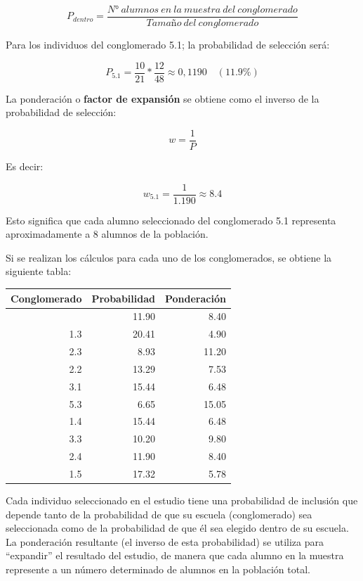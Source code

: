\documentclass[
  spanish,
  a4paper,
]{scrbook}
\begin{document}
\[
P_{dentro} = \frac{N°~alumnos~en~la~muestra~del~conglomerado}{Tamaño~del~conglomerado}
\]

Para los individuos del conglomerado 5.1; la probabilidad de selección
será:

\[
P_{5.1} = \frac{10}{21}*\frac{12}{48} \approx 0,1190 \quad (11.9\%)
\]

La ponderación o \textbf{factor de expansión} se obtiene como el inverso
de la probabilidad de selección:

\[
w = \frac{1}{P}
\]

Es decir:

\[
w_{5.1} = \frac{1}{1.190} \approx 8.4
\]

Esto significa que cada alumno seleccionado del conglomerado 5.1
representa aproximadamente a 8 alumnos de la población.

Si se realizan los cálculos para cada uno de los conglomerados, se
obtiene la siguiente tabla:

\begin{table}
\fontsize{12.0pt}{14.0pt}\selectfont
\begin{tabular*}{\linewidth}{@{\extracolsep{\fill}}rrr}
\toprule
Conglomerado & Probabilidad & Ponderación \\ 
\midrule\addlinespace[2.5pt]
5.1 & 11.90 & 8.40 \\ 
1.3 & 20.41 & 4.90 \\ 
2.3 & 8.93 & 11.20 \\ 
2.2 & 13.29 & 7.53 \\ 
3.1 & 15.44 & 6.48 \\ 
5.3 & 6.65 & 15.05 \\ 
1.4 & 15.44 & 6.48 \\ 
3.3 & 10.20 & 9.80 \\ 
2.4 & 11.90 & 8.40 \\ 
1.5 & 17.32 & 5.78 \\ 
\bottomrule
\end{tabular*}
\end{table}

Cada individuo seleccionado en el estudio tiene una probabilidad de
inclusión que depende tanto de la probabilidad de que su escuela
(conglomerado) sea seleccionada como de la probabilidad de que él sea
elegido dentro de su escuela. La ponderación resultante (el inverso de
esta probabilidad) se utiliza para ``expandir'' el resultado del
estudio, de manera que cada alumno en la muestra represente a un número
determinado de alumnos en la población total.
\end{document}
